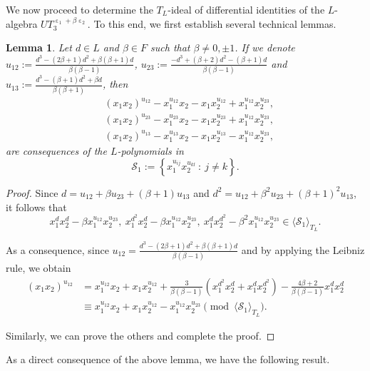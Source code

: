 \documentclass[a4paper,reqno]{amsart}
\newtheorem{lemma}[theorem]{Lemma}
\theoremstyle{definition}
\numberwithin{equation}{section}
\numberwithin{theorem}{section}
\DeclareMathOperator{\e}{\varepsilon}
\begin{document}
We now proceed to determine the $T_L$-ideal of differential identities of the $L$-algebra $UT_3^{\e_1+\beta\e_2}.$ To this end, we first establish several technical lemmas.







\begin{lemma}\label{lem: u_12 u_23 u_13 on x_1x_2}
    Let $d\in L$ and $\beta\in F$ such that $\beta\neq 0, \pm 1$. If we denote $u_{12}:=\frac{d^3- (2\beta+1)d^2+\beta(\beta+1)d}{\beta(\beta-1)}$, $u_{23}:=\frac{-d^3+(\beta+2)d^2-(\beta+1)d}{\beta(\beta-1)}$ and $u_{13}:=\frac{d^3-(\beta+1)d^2+\beta d}{\beta(\beta+1)}$, then
    \begin{align*}
        &(x_1 x_2)^{u_{12}}- x_1^{u_{12}} x_2 - x_1x_2^{u_{12}} +x_1^{u_{12}} x_2^{u_{23}} ,
        \\
        & (x_1 x_2)^{u_{23}}- x_1^{u_{23}} x_2 - x_1x_2^{u_{23}} +x_1^{u_{12}} x_2^{u_{23}}, \\
        &(x_1 x_2)^{u_{13}}- x_1^{u_{13}} x_2 - x_1x_2^{u_{13}}- x_1^{u_{12}} x_2^{u_{23}},
    \end{align*}
are consequences of the $L$-polynomials in 
$$\mathcal{S}_1:=\left\{ x_1^{u_{ij}}x_2^{u_{kl}} \ : \ j\neq k \right\}.$$
\end{lemma}
\begin{proof}
Since $d= u_{12}+\beta u_{23}+(\beta +1)u_{13}$ and $d^2= u_{12}+\beta^2 u_{23}+(\beta +1)^2 u_{13}$, it follows that 
$$
x_1^{d}x_2^{d}-\beta x_1^{u_{12}} x_2^{u_{23}}, \  x_1^{d^2}x_2^{d}-\beta x_1^{u_{12}} x_2^{u_{23}}, \  x_1^{d}x_2^{d^2}-\beta^2 x_1^{u_{12}} x_2^{u_{23}}\in \langle \mathcal{S}_1\rangle_{T_L}.
$$

As a consequence, since $u_{12}=\frac{d^3- (2\beta+1)d^2+\beta(\beta+1)d}{\beta(\beta-1)}$ and by applying the Leibniz rule, we obtain
\begin{align*}
    (x_1 x_2)^{u_{12}}&= x_1^{u_{12}} x_2 + x_1x_2^{u_{12}}+\frac{3}{\beta(\beta-1)}(x_1^{d^2}x_2^{d}+x_1^dx_2^{d^2})- \frac{4\beta+2}{\beta(\beta-1)}x_1^dx_2^d\\
    &\equiv x_1^{u_{12}} x_2 + x_1x_2^{u_{12}}- x_1^{u_{12}} x_2^{u_{23}} \pmod{\langle \mathcal{S}_1  \rangle_{T_L}}.
\end{align*}

Similarly, we can prove the others and complete the proof.
\end{proof}

As a direct consequence of the above lemma, we have the following result.
\end{document}
